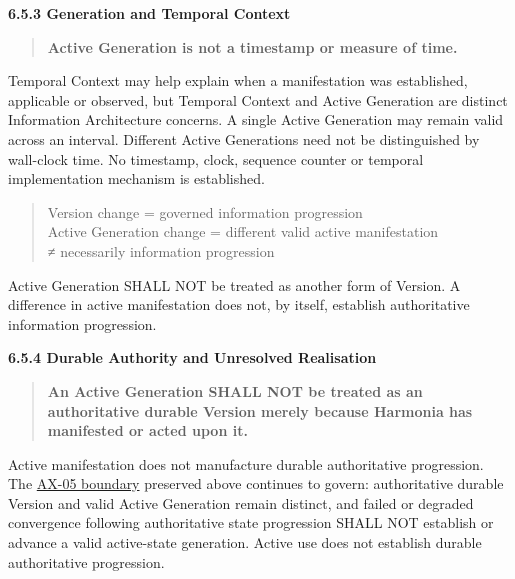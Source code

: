 \par\medskip\textbf{6.5.3 Generation and Temporal Context}\par


\begin{quote}


\textbf{Active Generation is not a timestamp or measure of time.}



\end{quote}


Temporal Context may help explain when a manifestation was established,
applicable or observed, but Temporal Context and Active Generation are distinct
Information Architecture concerns. A single Active Generation may remain valid
across an interval. Different Active Generations need not be distinguished by
wall-clock time. No timestamp, clock, sequence counter or temporal implementation
mechanism is established.



\begin{quote}\small\ttfamily
Version change           = governed information progression\\
Active Generation change = different valid active manifestation\\
                         ≠ necessarily information progression\\

\end{quote}


Active Generation SHALL NOT be treated as another form of Version. A difference
in active manifestation does not, by itself, establish authoritative information
progression.



\par\medskip\textbf{6.5.4 Durable Authority and Unresolved Realisation}\par


\begin{quote}


\textbf{An Active Generation SHALL NOT be treated as an authoritative durable Version merely because Harmonia has manifested or acted upon it.}



\end{quote}


Active manifestation does not manufacture durable authoritative progression.
The \hyperref[element:0412a2084f0145babc4f022c71fea65f]{AX-05 boundary} preserved above
continues to govern: authoritative durable Version and valid Active Generation
remain distinct, and failed or degraded convergence following authoritative state
progression SHALL NOT establish or advance a valid active-state generation.
Active use does not establish durable authoritative progression.



